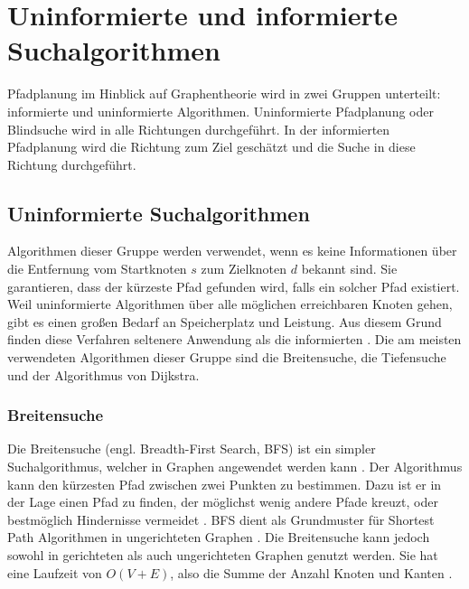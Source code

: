 \chapter{Uninformierte und informierte Suchalgorithmen}

Pfadplanung im Hinblick auf Graphentheorie wird in zwei Gruppen unterteilt: informierte und uninformierte Algorithmen. Uninformierte Pfadplanung oder Blindsuche %
wird in alle Richtungen durchgeführt. In der informierten Pfadplanung wird die Richtung zum Ziel geschätzt und die Suche in diese Richtung durchgeführt\cite{comAnal}. %

\section{Uninformierte Suchalgorithmen}
Algorithmen dieser Gruppe werden verwendet, wenn es keine Informationen über die Entfernung vom Startknoten $s$ zum Zielknoten $d$ bekannt sind.
Sie garantieren, dass der kürzeste Pfad gefunden wird, falls ein solcher Pfad existiert\cite{comAnal}. Weil uninformierte Algorithmen über alle möglichen erreichbaren Knoten gehen, gibt es einen großen Bedarf an Speicherplatz und Leistung. Aus diesem Grund finden diese Verfahren seltenere Anwendung als die informierten \cite{sim}. Die am meisten verwendeten Algorithmen dieser Gruppe sind die Breitensuche, die Tiefensuche und der Algorithmus von Dijkstra.

\subsection{Breitensuche}

Die Breitensuche (engl. Breadth-First Search, BFS) ist ein simpler Suchalgorithmus, welcher in Graphen angewendet werden kann \cite{Cormen.2009}. Der Algorithmus kann den kürzesten Pfad zwischen zwei Punkten zu bestimmen. Dazu ist er in der Lage einen Pfad zu finden, der möglichst wenig andere Pfade kreuzt, oder bestmöglich Hindernisse vermeidet \cite{Lee.1961}. BFS dient als Grundmuster für Shortest Path Algorithmen in ungerichteten Graphen \cite{Ottmann.2017}. Die Breitensuche kann jedoch sowohl in gerichteten als auch ungerichteten Graphen genutzt werden. Sie hat eine Laufzeit von $O(V + E)$, also die Summe der Anzahl Knoten und Kanten \cite{Cormen.2009}.

